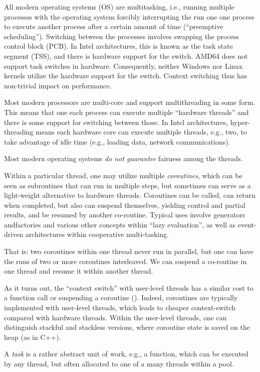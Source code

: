 All modern operating systems (OS) are multitasking, i.e., running multiple processes with the operating system forcibly interrupting the run one one process to execute another process after a certain amount of time (``preemptive scheduling''). Switching between the processes involves swapping the process control block (PCB). In Intel architectures, this is known as the task state segment (TSS), and there is hardware support for the switch. AMD64 does not support task switches in hardware.
Consequently, neither Windows nor Linux kernels utilize the hardware support for the switch.
Context switching thus has non-trivial impact on performance. 

Most modern processors are multi-core and support multithreading in some form. This means that one 
each process can execute multiple ``hardware threads'' and there is some support for switching between those. In Intel architectures, hyper-threading means each hardware core can execute multiple threads, e.g., two, to take advantage of idle time (e.g., loading data, network communications).  

Most modern operating systems \emph{do not guarantee} fairness among the threads. 

Within a particular thread, one may utilize multiple \emph{coroutines}, which can be seen as subroutines that can run in multiple steps, but sometimes can serve as a light-weight alternative to hardware threads. Coroutines can be called, can return when completed, but also can suspend themselves, yielding control and partial results, and be resumed by another co-routine. Typical uses involve generators andfactories and various other concepts within ``lazy evaluation'', as well as event-driven architectures within cooperative multi-tasking. 

That is: two coroutines within one thread never run in parallel, but one can have the runs of two or more coroutines interleaved. We can suspend a co-routine in one thread and resume it within another thread. 

As it turns out, the ``context switch'' with user-level threads has a similar cost to a function call or suspending a coroutine (). Indeed, coroutines are typically implemented with user-level threads, which leads to cheaper context-switch compared with hardware threads. Within the user-level threads, one can distinguish stackful and stackless versions, where coroutine state is saved on the heap (as in C++). 

A \emph{task} is a rather abstract unit of work, e.g., a function, which can be executed by any thread, but often allocated to one of a many threads within a pool. 

